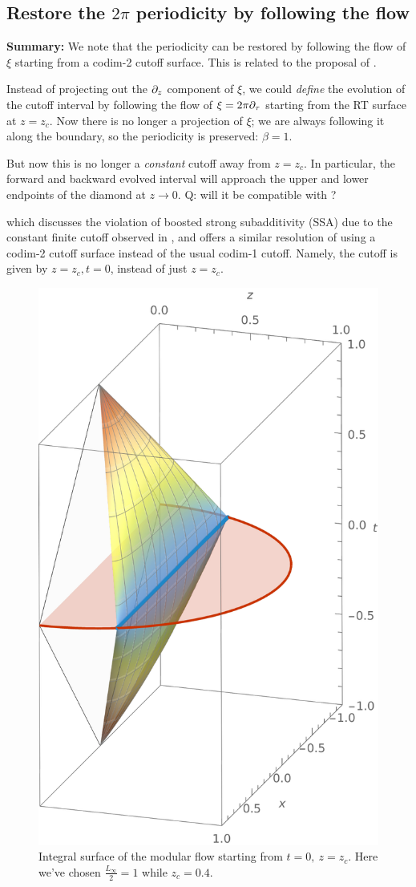 \documentclass[11pt,a4paper,utf8]{article}
\begin{document}
\pagebreak


\subsection{Restore the $2\pi$ periodicity by following the flow}
	
\textbf{Summary:} We note that the periodicity can be restored by following the flow of $\xi$ starting from a codim-2 cutoff surface. This is related to the proposal of \cite{Grado-White:2020wlb}. 
	
	Instead of projecting out the $\partial_{z}$ component of $\xi$, we could \textit{define} the evolution of the cutoff interval by following the flow of $\xi = 2\pi\partial_{\tau}$ starting from the RT surface at $z = z_c$. Now there is no longer a projection of $\xi$; we are always following it along the boundary, so the periodicity is preserved: $\beta = 1$. 
	
	But now this is no longer a \textit{constant} cutoff away from $z = z_c$. In particular, the forward and backward evolved interval will approach the upper and lower endpoints of the diamond at $z \to 0$. Q: will it be compatible with \textcite{McGough:2016lol}? 
	
	 which discusses the violation of boosted strong subadditivity (SSA) due to the constant finite cutoff observed in \cite{Lewkowycz:2019xse}, and offers a similar resolution of using a codim-2 cutoff surface instead of the usual codim-1 cutoff. Namely, the cutoff is given by $
		z = z_c, t = 0
	$, instead of just $z = z_c$. 
	
	\begin{figure}[!ht]
	\centering
	\includegraphics[width=.35\linewidth]{img/modFlowAnalytic.pdf}
	\caption{Integral surface of the modular flow starting from $t = 0,\ z = z_c$. Here we've chosen $\frac{L_\infty}{2} = 1$ while $z_c = 0.4$.}
	\end{figure}
	
\end{document}
